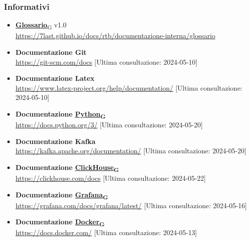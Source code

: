 \subsubsection{Informativi}
\begin{itemize}
    \item\href{https://7last.github.io/docs/rtb/documentazione-interna/glossario\#glossario}{\textbf{Glossario}\textsubscript{G}} v1.0\\ \url{https://7last.github.io/docs/rtb/documentazione-interna/glossario}
    \item\textbf{Documentazione Git}\\ \url{https://git-scm.com/docs} [Ultima consultazione: 2024-05-10]
    \item\textbf{Documentazione Latex}\\ \url{https://www.latex-project.org/help/documentation/} [Ultima consultazione: 2024-05-10]
    \item\textbf{Documentazione \href{https://7last.github.io/docs/rtb/documentazione-interna/glossario\#python}{Python\textsubscript{G}}}\\ \url{https://docs.python.org/3/} [Ultima consultazione: 2024-05-20]
    \item\textbf{Documentazione Kafka}\\ \url{https://kafka.apache.org/documentation/} [Ultima consultazione: 2024-05-20]
    \item\textbf{Documentazione \href{https://7last.github.io/docs/rtb/documentazione-interna/glossario\#clickhouse}{ClickHouse\textsubscript{G}}}\\ \url{https://clickhouse.com/docs} [Ultima consultazione: 2024-05-22]
    \item\textbf{Documentazione \href{https://7last.github.io/docs/rtb/documentazione-interna/glossario\#grafana}{Grafana\textsubscript{G}}}\\ \url{https://grafana.com/docs/grafana/latest/} [Ultima consultazione: 2024-05-16]
    \item\textbf{Documentazione \href{https://7last.github.io/docs/rtb/documentazione-interna/glossario\#docker}{Docker\textsubscript{G}}}\\ \url{https://docs.docker.com/} [Ultima consultazione: 2024-05-13]
\end{itemize}